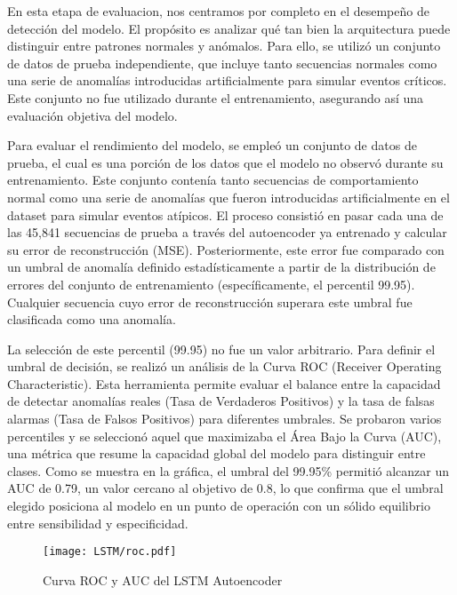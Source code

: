 
En esta etapa de evaluacion, nos centramos por completo en el desempeño de detección del modelo. El propósito es analizar qué tan bien la arquitectura puede distinguir entre patrones normales y anómalos. Para ello, se utilizó un conjunto de datos de prueba independiente, que incluye tanto secuencias normales como una serie de anomalías introducidas artificialmente para simular eventos críticos. Este conjunto no fue utilizado durante el entrenamiento, asegurando así una evaluación objetiva del modelo.


Para evaluar el rendimiento del modelo, se empleó un conjunto de datos de prueba, el cual es una porción de los datos que el modelo no observó durante su entrenamiento. Este conjunto contenía tanto secuencias de comportamiento normal como una serie de anomalías que fueron introducidas artificialmente en el dataset para simular eventos atípicos.
El proceso consistió en pasar cada una de las 45,841 secuencias de prueba a través del autoencoder ya entrenado y calcular su error de reconstrucción (MSE). Posteriormente, este error fue comparado con un umbral de anomalía definido estadísticamente a partir de la distribución de errores del conjunto de entrenamiento (específicamente, el percentil 99.95). Cualquier secuencia cuyo error de reconstrucción superara este umbral fue clasificada como una anomalía.

La selección de este percentil (99.95) no fue un valor arbitrario. Para definir el umbral de decisión, se realizó un análisis de la Curva ROC (Receiver Operating Characteristic). Esta herramienta permite evaluar el balance entre la capacidad de detectar anomalías reales (Tasa de Verdaderos Positivos) y la tasa de falsas alarmas (Tasa de Falsos Positivos) para diferentes umbrales. Se probaron varios percentiles y se seleccionó aquel que maximizaba el Área Bajo la Curva (AUC), una métrica que resume la capacidad global del modelo para distinguir entre clases. Como se muestra en la gráfica, el umbral del 99.95\% permitió alcanzar un AUC de 0.79, un valor cercano al objetivo de 0.8, lo que confirma que el umbral elegido posiciona al modelo en un punto de operación con un sólido equilibrio entre sensibilidad y especificidad.

\begin{figure}[ht!]
      \centering
      \texttt{[image: LSTM/roc.pdf]}
      \caption{Curva ROC y AUC del LSTM Autoencoder}
      \label{fig:roc_lstm}
\end{figure}

